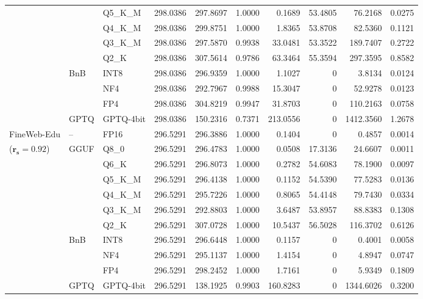 \begin{longtable}{ll l rrrrrrr}
 &  & Q5\_K\_M & 298.0386 & 297.8697 & 1.0000 & 0.1689 & 53.4805 & 76.2168 & 0.0275 \\
 &  & Q4\_K\_M & 298.0386 & 299.8751 & 1.0000 & 1.8365 & 53.8708 & 82.5360 & 0.1121 \\
 &  & Q3\_K\_M & 298.0386 & 297.5870 & 0.9938 & 33.0481 & 53.3522 & 189.7407 & 0.2722 \\
 &  & Q2\_K & 298.0386 & 307.5614 & 0.9786 & 63.3464 & 55.3594 & 297.3595 & 0.8582 \\
 & BnB & INT8 & 298.0386 & 296.9359 & 1.0000 & 1.1027 & \cellcolor{cyan!12} $0$ & 3.8134 & 0.0124 \\
 &  & NF4 & 298.0386 & 292.7967 & 0.9988 & 15.3047 & \cellcolor{cyan!12} $0$ & 52.9278 & 0.0123 \\
 &  & FP4 & 298.0386 & 304.8219 & 0.9947 & 31.8703 & \cellcolor{cyan!12} $0$ & 110.2163 & 0.0758 \\
 & GPTQ & GPTQ-4bit & 298.0386 & 150.2316 & \cellcolor{red!35} 0.7371 & \cellcolor{red!35} 213.0556 & \cellcolor{cyan!12} $0$ & \cellcolor{red!35} 1412.3560 & \cellcolor{red!35} 1.2678 \\
\midrule
FineWeb-Edu & -- & FP16 & 296.5291 & 296.3886 & 1.0000 & 0.1404 & \cellcolor{cyan!12} $0$ & 0.4857 & 0.0014 \\
{\small ($\mathbf{r_s{=}0.92}$)} & GGUF & Q8\_0 & 296.5291 & 296.4783 & 1.0000 & 0.0508 & 17.3136 & 24.6607 & 0.0011 \\
 &  & Q6\_K & 296.5291 & 296.8073 & 1.0000 & 0.2782 & 54.6083 & 78.1900 & 0.0097 \\
 &  & Q5\_K\_M & 296.5291 & 296.4138 & 1.0000 & 0.1152 & 54.5390 & 77.5283 & 0.0136 \\
 &  & Q4\_K\_M & 296.5291 & 295.7226 & 1.0000 & 0.8065 & 54.4148 & 79.7430 & 0.0334 \\
 &  & Q3\_K\_M & 296.5291 & 292.8803 & 1.0000 & 3.6487 & 53.8957 & 88.8383 & 0.1308 \\
 &  & Q2\_K & 296.5291 & 307.0728 & 1.0000 & 10.5437 & 56.5028 & 116.3702 & 0.6126 \\
 & BnB & INT8 & 296.5291 & 296.6448 & 1.0000 & 0.1157 & \cellcolor{cyan!12} $0$ & 0.4001 & 0.0058 \\
 &  & NF4 & 296.5291 & 295.1137 & 1.0000 & 1.4154 & \cellcolor{cyan!12} $0$ & 4.8947 & 0.0747 \\
 &  & FP4 & 296.5291 & 298.2452 & 1.0000 & 1.7161 & \cellcolor{cyan!12} $0$ & 5.9349 & 0.1809 \\
 & GPTQ & GPTQ-4bit & 296.5291 & 138.1925 & 0.9903 & 160.8283 & \cellcolor{cyan!12} $0$ & 1344.6026 & 0.3200 \\

\end{longtable}
